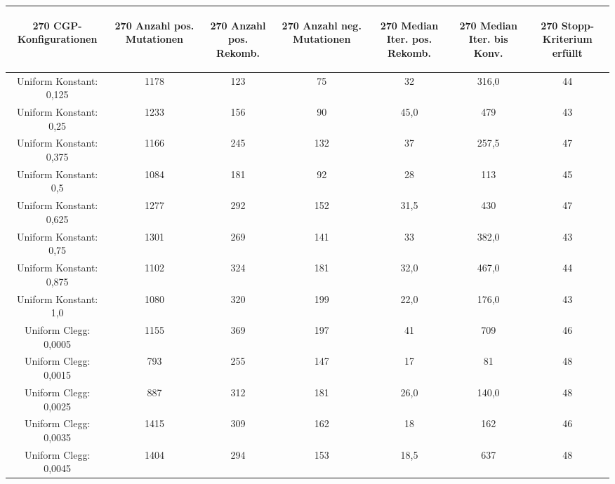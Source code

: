 \begin{table}[H]
	\centering
	\begin{tabular}{c | c | c | c | c | c | c}
		\begin{turn}{270} \textbf{CGP-Konfigurationen} \end{turn} & \begin{turn}{270} \textbf{Anzahl pos. Mutationen} \end{turn} & \begin{turn}{270} \textbf{Anzahl pos. Rekomb.} \end{turn} & \begin{turn}{270} \textbf{Anzahl neg. Mutationen} \end{turn} & \begin{turn}{270} \textbf{Median Iter. pos. Rekomb.} \end{turn} & \begin{turn}{270} \textbf{Median Iter. bis Konv.} \end{turn} & \begin{turn}{270} \textbf{Stopp-Kriterium erfüllt} \end{turn}\\
		\hline
		Uniform Konstant: 0,125 & 1178 & 123 & 75 & 32 & 316,0 & 44\\
		\hline
		Uniform Konstant: 0,25 & 1233 & 156 & 90 & 45,0 & 479 & 43\\
		\hline
		Uniform Konstant: 0,375 & 1166 & 245 & 132 & 37 & 257,5 & 47\\
		\hline
		Uniform Konstant: 0,5 & 1084 & 181 & 92 & 28 & 113 & 45\\
		\hline
		Uniform Konstant: 0,625 & 1277 & 292 & 152 & 31,5 & 430 & 47\\
		\hline
		Uniform Konstant: 0,75 & 1301 & 269 & 141 & 33 & 382,0 & 43\\
		\hline
		Uniform Konstant: 0,875 & 1102 & 324 & 181 & 32,0 & 467,0 & 44\\
		\hline
		Uniform Konstant: 1,0 & 1080 & 320 & 199 & 22,0 & 176,0 & 43\\
		\hline
		Uniform Clegg: 0,0005 & 1155 & 369 & 197 & 41 & 709 & 46\\
		\hline
		Uniform Clegg: 0,0015 & 793 & 255 & 147 & 17 & 81 & 48\\
		\hline
		Uniform Clegg: 0,0025 & 887 & 312 & 181 & 26,0 & 140,0 & 48\\
		\hline
		Uniform Clegg: 0,0035 & 1415 & 309 & 162 & 18 & 162 & 46\\
		\hline
		Uniform Clegg: 0,0045 & 1404 & 294 & 153 & 18,5 & 637 & 48\\

\end{tabular}
\end{table}
